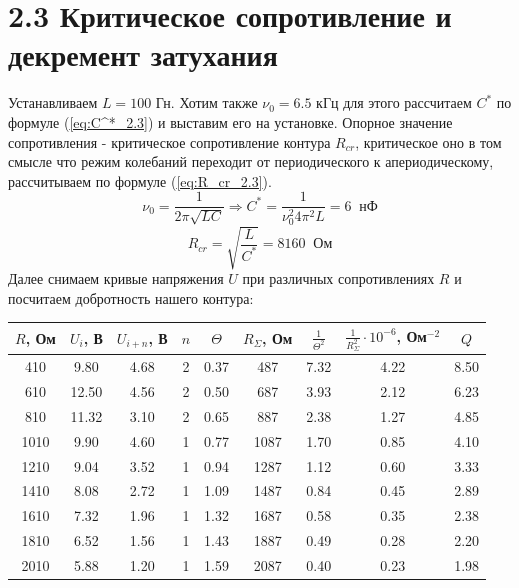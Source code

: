 \documentclass[a4paper,12pt]{extarticle}
\begin{document}
\section*{2.3 Критическое сопротивление и декремент затухания}
Устанавливаем $L = 100$ Гн. Хотим также $\nu_0 = 6.5$ кГц для этого рассчитаем $C^*$ по формуле (\ref{eq:C^*_2.3}) и выставим его на установке. Опорное значение сопротивления - критическое сопротивление контура $R_{cr}$, критическое оно в том смысле что режим колебаний переходит от периодического к апериодическому, рассчитываем по формуле (\ref{eq:R_cr_2.3}). 
\begin{equation}
    \nu_0 = \frac{1}{2\pi \sqrt{LC}} \Rightarrow C^* = \frac{1}{\nu_0^2 4 \pi^2 L} = 6\;\;\text{нФ}
    \label{eq:C^*_2.3}
\end{equation}
\begin{equation}
    R_{cr} =  \sqrt{\frac{L}{C^*}} = 8160\;\;\text{Ом}
    \label{eq:R_cr_2.3}
\end{equation}
Далее снимаем кривые напряжения $U$ при различных сопротивлениях $R$ и посчитаем добротность нашего контура:\\
\begin{tabular}{|c|c|c|c|c|c|c|c|c|}
\hline
$R$, Ом    & $U_i$, В     & $U_{i+n}$, В    & $n$ & $\Theta$ & $R_\Sigma$, Ом & $\frac{1}{\Theta^2}$ &  $\frac{1}{R_\Sigma^2} \cdot 10^{-6}$, Ом$^{-2}$ & $Q$ \\ \hline
410  & 9.80  & 4.68 & 2 & 0.37 & 487  & 7.32                   & 4.22                   & 8.50 \\ \hline
610  & 12.50 & 4.56 & 2 & 0.50 & 687  & 3.93                   & 2.12                   & 6.23 \\ \hline
810  & 11.32 & 3.10 & 2 & 0.65 & 887  & 2.38                   & 1.27                   & 4.85 \\ \hline
1010 & 9.90  & 4.60 & 1 & 0.77 & 1087 & 1.70                   & 0.85                   & 4.10 \\ \hline
1210 & 9.04  & 3.52 & 1 & 0.94 & 1287 & 1.12                   & 0.60                   & 3.33 \\ \hline
1410 & 8.08  & 2.72 & 1 & 1.09 & 1487 & 0.84                   & 0.45                   & 2.89 \\ \hline
1610 & 7.32  & 1.96 & 1 & 1.32 & 1687 & 0.58                   & 0.35                   & 2.38 \\ \hline
1810 & 6.52  & 1.56 & 1 & 1.43 & 1887 & 0.49                   & 0.28                   & 2.20 \\ \hline
2010 & 5.88  & 1.20 & 1 & 1.59 & 2087 & 0.40                   & 0.23                   & 1.98 \\ \hline
\end{tabular}\\
\end{document}

